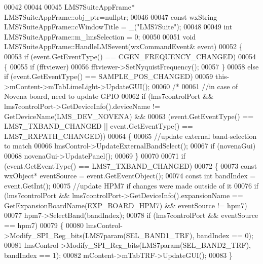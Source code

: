 \begin{DoxyCode}
00042 
00044 
00045 LMS7SuiteAppFrame* LMS7SuiteAppFrame::obj_ptr=\textcolor{keyword}{nullptr};
00046 
00047 \textcolor{keyword}{const} wxString LMS7SuiteAppFrame::cWindowTitle = \_(\textcolor{stringliteral}{"LMS7Suite"});
00048 
00049 \textcolor{keywordtype}{int} LMS7SuiteAppFrame::m_lmsSelection = 0;
00050 
00051 \textcolor{keywordtype}{void} LMS7SuiteAppFrame::HandleLMSevent(wxCommandEvent& event)
00052 \{
00053     \textcolor{keywordflow}{if} (event.GetEventType() == CGEN\_FREQUENCY\_CHANGED)
00054     \{
00055         \textcolor{keywordflow}{if} (fftviewer)
00056             fftviewer->SetNyquistFrequency();
00057     \}
00058     \textcolor{keywordflow}{else} \textcolor{keywordflow}{if} (event.GetEventType() == SAMPLE\_POS\_CHANGED)
00059         this->mContent->mTabLimeLight->UpdateGUI();
00060 \textcolor{comment}{/*}
00061 \textcolor{comment}{    //in case of Novena board, need to update GPIO}
00062 \textcolor{comment}{    if (lms7controlPort && lms7controlPort->GetDeviceInfo().deviceName != GetDeviceName(LMS\_DEV\_NOVENA) &&}
00063 \textcolor{comment}{        (event.GetEventType() == LMS7\_TXBAND\_CHANGED || event.GetEventType() == LMS7\_RXPATH\_CHANGED))}
00064 \textcolor{comment}{    \{}
00065 \textcolor{comment}{        //update external band-selection to match}
00066 \textcolor{comment}{        lmsControl->UpdateExternalBandSelect();}
00067 \textcolor{comment}{        if (novenaGui)}
00068 \textcolor{comment}{            novenaGui->UpdatePanel();}
00069 \textcolor{comment}{    \}}
00070 \textcolor{comment}{}
00071 \textcolor{comment}{    if (event.GetEventType() == LMS7\_TXBAND\_CHANGED)}
00072 \textcolor{comment}{    \{}
00073 \textcolor{comment}{        const wxObject* eventSource = event.GetEventObject();}
00074 \textcolor{comment}{        const int bandIndex = event.GetInt();}
00075 \textcolor{comment}{        //update HPM7 if changes were made outside of it}
00076 \textcolor{comment}{        if (lms7controlPort && lms7controlPort->GetDeviceInfo().expansionName ==
       GetExpansionBoardName(EXP\_BOARD\_HPM7) && eventSource != hpm7)}
00077 \textcolor{comment}{            hpm7->SelectBand(bandIndex);}
00078 \textcolor{comment}{        if (lms7controlPort && eventSource == hpm7)}
00079 \textcolor{comment}{        \{}
00080 \textcolor{comment}{            lmsControl->Modify\_SPI\_Reg\_bits(LMS7param(SEL\_BAND1\_TRF), bandIndex == 0);}
00081 \textcolor{comment}{            lmsControl->Modify\_SPI\_Reg\_bits(LMS7param(SEL\_BAND2\_TRF), bandIndex == 1);}
00082 \textcolor{comment}{            mContent->mTabTRF->UpdateGUI();}
00083 \textcolor{comment}{        \}}

\end{DoxyCode}
